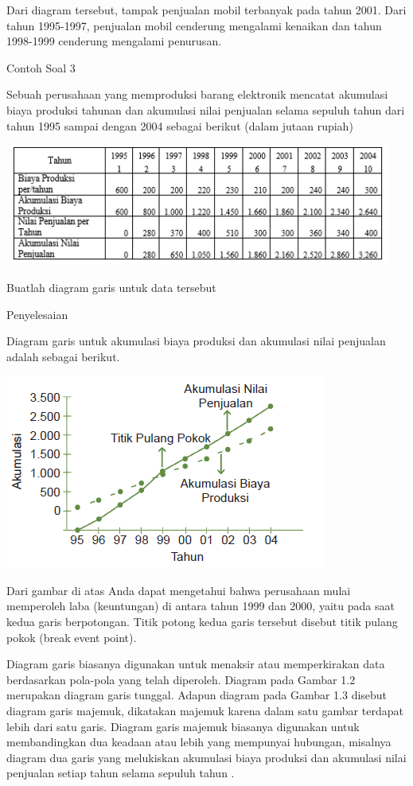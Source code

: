 \documentclass[11pt,fleqn]{book} %
\begin{document}
{Dari diagram tersebut, tampak penjualan mobil terbanyak pada tahun 2001. Dari tahun 1995-1997, penjualan mobil cenderung mengalami kenaikan dan tahun 1998-1999 cenderung mengalami penurusan.

Contoh Soal 3

Sebuah perusahaan yang memproduksi barang elektronik mencatat akumulasi biaya produksi tahunan dan akumulasi nilai penjualan selama sepuluh tahun dari tahun 1995 sampai dengan 2004 sebagai berikut (dalam jutaan rupiah)

\includegraphics[width = 12.8cm, height= 4cm]{Pictures/Gb5_diana.png}

Buatlah diagram garis untuk data tersebut

Penyelesaian

Diagram garis untuk akumulasi biaya produksi dan akumulasi nilai penjualan adalah sebagai berikut.

\includegraphics[width = 10.6cm, height= 6.4cm]{Pictures/Gb6_diana.png}

Dari gambar di atas Anda dapat mengetahui bahwa perusahaan mulai memperoleh laba (keuntungan) di antara tahun 1999 dan 2000, yaitu pada saat kedua garis berpotongan. Titik potong kedua garis tersebut disebut titik pulang pokok (break event point).

	Diagram garis biasanya digunakan untuk menaksir atau memperkirakan data berdasarkan pola-pola yang telah diperoleh. Diagram pada Gambar 1.2 merupakan diagram garis tunggal. Adapun diagram pada Gambar 1.3 disebut diagram garis majemuk, dikatakan majemuk karena dalam satu gambar terdapat lebih dari satu garis. Diagram garis majemuk biasanya digunakan untuk membandingkan dua keadaan atau lebih yang mempunyai hubungan, misalnya diagram dua garis yang melukiskan akumulasi biaya produksi dan akumulasi nilai penjualan setiap tahun selama sepuluh tahun .

}
\end{document}
